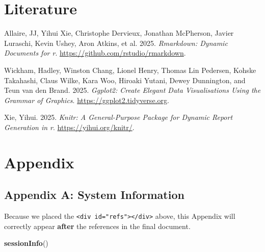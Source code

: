 \documentclass[
]{article}
\newenvironment{Shaded}{\begin{snugshade}}{\end{snugshade}}
\newcommand{\FunctionTok}[1]{\textcolor[rgb]{0.13,0.29,0.53}{\textbf{#1}}}
\newcommand{\NormalTok}[1]{#1}
\newlength{\cslhangindent}
\newenvironment{CSLReferences}[2] %
 {\begin{list}{}{%
  \setlength{\itemindent}{0pt}
  \setlength{\leftmargin}{0pt}
  \setlength{\parsep}{0pt}
  \ifodd #1
   \setlength{\leftmargin}{\cslhangindent}
   \setlength{\itemindent}{-1\cslhangindent}
  \fi
  \setlength{\itemsep}{#2\baselineskip}}}
 {\end{list}}
\begin{document}
\section{Literature}\label{literature}

\label{refs}
\begin{CSLReferences}{1}{0}
Allaire, JJ, Yihui Xie, Christophe Dervieux, Jonathan McPherson, Javier
Luraschi, Kevin Ushey, Aron Atkins, et al. 2025. \emph{Rmarkdown:
Dynamic Documents for r}. \url{https://github.com/rstudio/rmarkdown}.

Wickham, Hadley, Winston Chang, Lionel Henry, Thomas Lin Pedersen,
Kohske Takahashi, Claus Wilke, Kara Woo, Hiroaki Yutani, Dewey
Dunnington, and Teun van den Brand. 2025. \emph{Ggplot2: Create Elegant
Data Visualisations Using the Grammar of Graphics}.
\url{https://ggplot2.tidyverse.org}.

Xie, Yihui. 2025. \emph{Knitr: A General-Purpose Package for Dynamic
Report Generation in r}. \url{https://yihui.org/knitr/}.

\end{CSLReferences}

\section{Appendix}\label{appendix}

\subsection{Appendix A: System
Information}\label{appendix-a-system-information}

Because we placed the
\texttt{\textless{}div\ id="refs"\textgreater{}\textless{}/div\textgreater{}}
above, this Appendix will correctly appear \textbf{after} the references
in the final document.

\begin{Shaded}
\begin{Highlighting}[]
\FunctionTok{sessionInfo}\NormalTok{()}
\end{Highlighting}
\end{Shaded}
\end{document}
